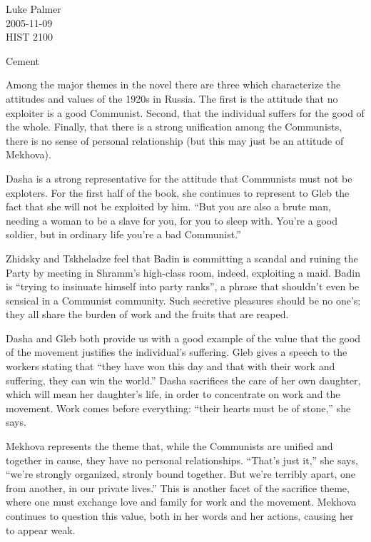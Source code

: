 \documentclass[12pt]{article}
\begin{document}
\noindent Luke Palmer \\
2005-11-09 \\
HIST 2100

\begin{center}
\Huge{Cement}
\end{center}

\doublespace

Among the major themes in the novel there are three which characterize
the attitudes and values of the 1920s in Russia.  The first is the
attitude that no exploiter is a good Communist.  Second, that the
individual suffers for the good of the whole.  Finally, that there is a
strong unification among the Communists, there is no sense of personal
relationship (but this may just be an attitude of Mekhova).

Dasha is a strong representative for the attitude that Communists must
not be exploters.  For the first half of the book, she continues to
represent to Gleb the fact that she will not be exploited by him.  ``But
you are also a brute man, needing a woman to be a slave for you, for you
to sleep with.  You're a good soldier, but in ordinary life you're a bad
Communist.''   

Zhidsky and Tskheladze feel that Badin is committing a scandal and
ruining the Party by meeting in Shramm's high-class room, indeed,
exploiting a maid.  Badin is ``trying to insinuate himself into party
ranks'', a phrase that shouldn't even be sensical in a Communist
community. Such secretive pleasures should be no one's; they all share
the burden of work and the fruits that are reaped.

Dasha and Gleb both provide us with a good example of the value that the
good of the movement justifies the individual's suffering. Gleb gives a
speech to the workers stating that ``they have won this day and that
with their work and suffering, they can win the world.''  Dasha
sacrifices the care of her own daughter, which will mean her daughter's
life, in order to concentrate on work and the movement.  Work comes
before everything: ``their hearts must be of stone,'' she says.

Mekhova represents the theme that, while the Communists are unified and
together in cause, they have no personal relationships.  ``That's just
it,'' she says, ``we're strongly organized, stronly bound together.  But
we're terribly apart, one from another, in our private lives.''  This is
another facet of the sacrifice theme, where one must exchange love and
family for work and the movement.  Mekhova continues to question this
value, both in her words and her actions, causing her to appear weak.
\end{document}

